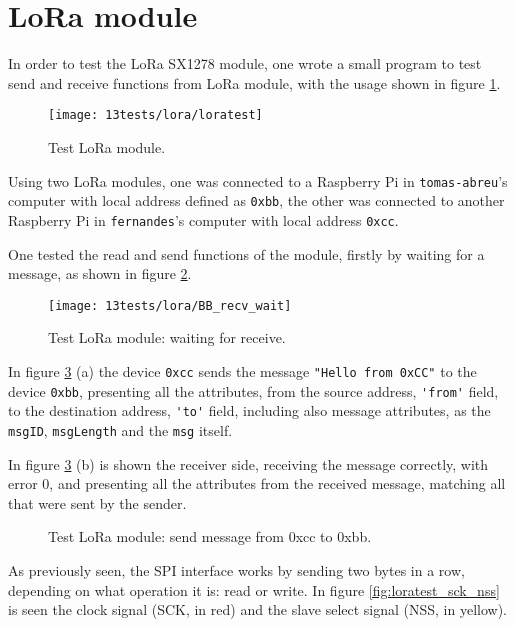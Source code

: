 \section{LoRa module}
In order to test the LoRa SX1278 module, one wrote a small program to test send and receive functions from LoRa module, with the usage shown in figure \ref{fig:loratest}.

\begin{figure}[H]
	\centering	
	\texttt{[image: 13tests/lora/loratest]}
	\caption{Test LoRa module.}
	\label{fig:loratest}
\end{figure}

Using two LoRa modules, one was connected to a Raspberry Pi in\linebreak
\verb|tomas-abreu|'s computer with local address defined as \verb|0xbb|, the other was connected to another Raspberry Pi in \verb|fernandes|'s computer with local address \verb|0xcc|.

One tested the read and send functions of the module, firstly by waiting for a message, as shown in figure \ref{fig:loratest_recv}.

\begin{figure}[H]
	\centering	
	\texttt{[image: 13tests/lora/BB\_recv\_wait]}
	\caption{Test LoRa module: waiting for receive.}
	\label{fig:loratest_recv}
\end{figure}

In figure \ref{fig:loratest_send} (a) the device \verb|0xcc| sends the message \verb|"Hello from 0xCC"| to the device \verb|0xbb|, presenting all the attributes, from the source address, \verb|'from'| field, to the destination address, \verb|'to'| field, including also message attributes, as the \verb|msgID|, \verb|msgLength| and the \verb|msg| itself.

In figure \ref{fig:loratest_send} (b) is shown the receiver side, receiving the message correctly, with error 0, and presenting all the attributes from the received message, matching all that were sent by the sender.

\begin{figure}[H]%
	\centering
	\qquad
	\caption{Test LoRa module: send message from 0xcc to 0xbb.}%
	\label{fig:loratest_send}%
\end{figure}
	
As previously seen, the SPI interface works by sending two bytes in a row, depending on what operation it is: read or write. In figure \ref{fig:loratest_sck_nss} is seen the clock signal (SCK, in red) and the slave select signal (NSS, in yellow).

